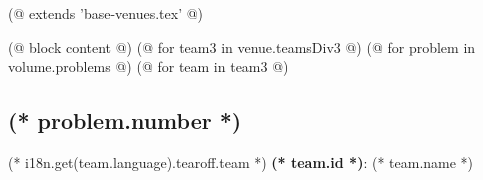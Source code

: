 (@ extends 'base-venues.tex' @)

(@ block content @)
    \pagestyle{tearoff}    
    (@ for team3 in venue.teamsDiv3 @)
        (@ for problem in volume.problems @)
            (@ for team in team3 @)%
                \setcounter{volume}{(* volume.number *)}%
                \setcounter{problem}{(* problem.number *)}%
                \setcounter{team}{(* team.id *)}%

                \begin{minipage}[t][96mm][t]{\textwidth}%
                    \begin{minipage}[t][88mm][t]{0.85\linewidth}%
                        \vspace{0pt}%
                        \subsection{\texorpdfstring{(* problem.number *)}{(* problem.number *). (* problem.id *)}}%
                        \setlength{\parskip}{6pt}
                    \end{minipage}%
                    \begin{minipage}[t][88mm][t]{0.15\linewidth}
                        \vspace{0mm}%
                        \hspace{4mm}%
                        \hspace{2pt}
                    \end{minipage}
                    {\small (* i18n.get(team.language).tearoff.team *) \textbf{(* team.id *)}: (* team.name *)}
                \end{minipage}%
